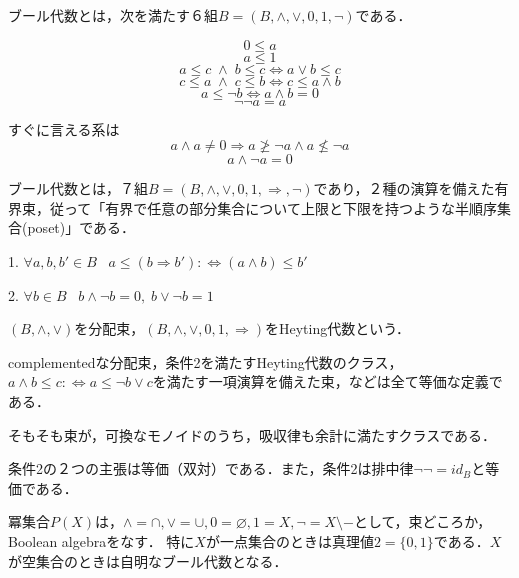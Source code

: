 \documentclass[uplatex, dvipdfmx]{jsarticle}
\begin{document}
\begin{definition*}[ブール代数１]
    ブール代数とは，次を満たす６組$B=(B,\land,\lor,0,1,\lnot)$である．

    \[ 0\le a \]
    \[ a\le 1 \]
    \[ a\le c\;\land\; b\le c\Leftrightarrow a\lor b\le c \]
    \[ c\le a \;\land\; c\le b \Leftrightarrow c\le a\land b \]
    \begin{equation}\label{formula-BooleanAlgebra-introduction-of-not}
        a\le\lnot b\Leftrightarrow a\land b=0
    \end{equation}
    \begin{equation}\label{formula-BooleanAlgebra-excluded-middle}
        \lnot\lnot a=a
    \end{equation}
\end{definition*}
\begin{remark*}
    すぐに言える系は
    \[ a\land a\ne 0\Rightarrow a\ngeq \lnot a \land a\nleq\lnot a  \]
    \[ a\land\lnot a=0 \]
\end{remark*}
\begin{definition*}[ブール代数２]
    ブール代数とは，７組$B=(B,\land,\lor,0,1,\Rightarrow,\lnot)$であり，２種の演算を備えた有界束，従って「有界で任意の部分集合について上限と下限を持つような半順序集合(poset)」である．

    1. $\forall a,b,b'\in B\;\;\; a\le (b\Rightarrow b'):\Leftrightarrow (a\land b)\le b'$
    
    2. $\forall b\in B\;\;\; b\land\lnot b=0,\; b\lor\lnot b=1$
\end{definition*}
\begin{remark*}
    $(B,\land,\lor)$を分配束，$(B,\land,\lor,0,1,\Rightarrow)$をHeyting代数という．

    complementedな分配束，条件2を満たすHeyting代数のクラス，$a\land b\le c:\Leftrightarrow a\le\lnot b\lor c$を満たす一項演算を備えた束，などは全て等価な定義である．

    そもそも束が，可換なモノイドのうち，吸収律も余計に満たすクラスである．

    条件2の２つの主張は等価（双対）である．また，条件2は排中律$\lnot\lnot = id_B$と等価である．
\end{remark*}
\begin{example*}
    冪集合$P(X)$は，$\land=\cap, \lor=\cup, 0=\varnothing, 1=X, \lnot=X\setminus -$として，束どころか，Boolean algebraをなす．
    特に$X$が一点集合のときは真理値$2=\{0,1\}$である．$X$が空集合のときは自明なブール代数となる．
\end{example*}
\end{document}
